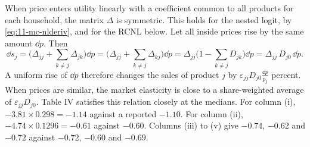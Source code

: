 \begin{remark}\label{rem:11-mc-identity}
When price enters utility linearly with a coefficient common to all products for each household, the matrix $\Delta$
is symmetric. This holds for the nested logit, by \eqref{eq:11-mc-nlderiv}, and for the RCNL below. Let all inside
prices rise by the same amount $\dd p$. Then
\begin{equation*}
  \dd s_j = \Big(\Delta_{jj} + \sum_{k\neq j}\Delta_{jk}\Big)\dd p = \Big(\Delta_{jj} + \sum_{k\neq j}\Delta_{kj}\Big)\dd p
  = \Delta_{jj}\Big(1 - \sum_{k\neq j}D_{jk}\Big)\dd p = \Delta_{jj}\, D_{j0}\, \dd p .
\end{equation*}
A uniform rise of $\dd p$ therefore changes the sales of product $j$ by $\varepsilon_{jj}D_{j0}\frac{\dd p}{p_j}$
percent. When prices are similar, the market elasticity is close to a share-weighted average of $\varepsilon_{jj}
D_{j0}$. Table IV satisfies this relation closely at the medians. For column (i), $-3.81 \times 0.298 = -1.14$ against a reported $-1.10$. For column
(ii), $-4.74 \times 0.1296 = -0.61$ against $-0.60$. Columns (iii) to (v) give $-0.74$, $-0.62$ and $-0.72$ against
$-0.72$, $-0.60$ and $-0.69$.
\end{remark}

